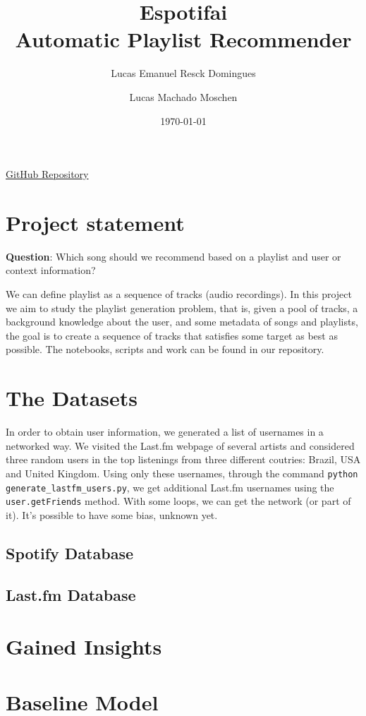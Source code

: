 \documentclass{article}
\title{Espotifai\\
\vspace{10pt}
\large Automatic Playlist Recommender}
\author[]{Lucas Emanuel Resck Domingues}
\author[]{Lucas Machado Moschen}
\affil[]{\textit{School of Applied Mathematics}
\\ \textit{Getulio Vargas Foundation}}
\date{\today}
\begin{document}
\maketitle

\begin{center}
    \href{https://github.com/lucasresck/espotifai}{GitHub Repository}
\end{center}

\section{Project statement}

    \textbf{Question}: Which song should we recommend based on
    a playlist and user or context information?

    We can define playlist as a sequence of tracks (audio recordings).
    In this project we aim to study the playlist generation problem, that is,
    given a pool of tracks, a background knowledge about the user,
    and some metadata of songs and playlists, the goal is to create a sequence
    of tracks that satisfies some target as best as possible. The notebooks,
    scripts and work can be found in our repository.

\section{The Datasets}

In order to obtain user information, we generated a list of usernames in a
networked way.  We visited the Last.fm webpage of several artists and
considered three random users in the top listenings from three different
coutries: Brazil, USA and United Kingdom. Using only these usernames, through
the command \lstinline{python generate_lastfm_users.py},  we get additional
Last.fm usernames using the \lstinline{user.getFriends} method. 
With some loops, we can get the network (or part of it). It's possible to have
some bias, unknown yet.

\subsection{Spotify Database}

\subsection{Last.fm Database}

\section{Gained Insights}

\section{Baseline Model}
\end{document}
